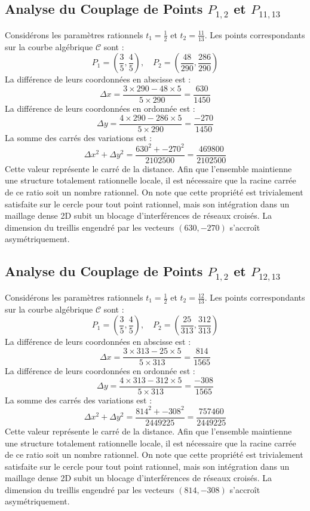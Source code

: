 \documentclass[12pt, a4paper]{article}
\begin{document}
\subsection{Analyse du Couplage de Points $P_{1,2}$ et $P_{11,13}$}
Considérons les paramètres rationnels $t_1 = \frac{1}{2}$ et $t_2 = \frac{11}{13}$.
Les points correspondants sur la courbe algébrique $\mathcal{C}$ sont :
$$ P_1 = \left( \frac{3}{5}, \frac{4}{5} \right), \quad P_2 = \left( \frac{48}{290}, \frac{286}{290} \right) $$
La différence de leurs coordonnées en abscisse est :
$$ \Delta x = \frac{3 \times 290 - 48 \times 5}{5 \times 290} = \frac{630}{1450} $$
La différence de leurs coordonnées en ordonnée est :
$$ \Delta y = \frac{4 \times 290 - 286 \times 5}{5 \times 290} = \frac{-270}{1450} $$
La somme des carrés des variations est :
$$ \Delta x^2 + \Delta y^2 = \frac{ 630^2 + -270^2 }{ 2102500 } = \frac{ 469800 }{ 2102500 } $$
Cette valeur représente le carré de la distance. Afin que l'ensemble maintienne une structure totalement rationnelle locale, il est nécessaire que la racine carrée de ce ratio soit un nombre rationnel. On note que cette propriété est trivialement satisfaite sur le cercle pour tout point rationnel, mais son intégration dans un maillage dense 2D subit un blocage d'interférences de réseaux croisés. La dimension du treillis engendré par les vecteurs $( 630, -270 )$ s'accroît asymétriquement.


\subsection{Analyse du Couplage de Points $P_{1,2}$ et $P_{12,13}$}
Considérons les paramètres rationnels $t_1 = \frac{1}{2}$ et $t_2 = \frac{12}{13}$.
Les points correspondants sur la courbe algébrique $\mathcal{C}$ sont :
$$ P_1 = \left( \frac{3}{5}, \frac{4}{5} \right), \quad P_2 = \left( \frac{25}{313}, \frac{312}{313} \right) $$
La différence de leurs coordonnées en abscisse est :
$$ \Delta x = \frac{3 \times 313 - 25 \times 5}{5 \times 313} = \frac{814}{1565} $$
La différence de leurs coordonnées en ordonnée est :
$$ \Delta y = \frac{4 \times 313 - 312 \times 5}{5 \times 313} = \frac{-308}{1565} $$
La somme des carrés des variations est :
$$ \Delta x^2 + \Delta y^2 = \frac{ 814^2 + -308^2 }{ 2449225 } = \frac{ 757460 }{ 2449225 } $$
Cette valeur représente le carré de la distance. Afin que l'ensemble maintienne une structure totalement rationnelle locale, il est nécessaire que la racine carrée de ce ratio soit un nombre rationnel. On note que cette propriété est trivialement satisfaite sur le cercle pour tout point rationnel, mais son intégration dans un maillage dense 2D subit un blocage d'interférences de réseaux croisés. La dimension du treillis engendré par les vecteurs $( 814, -308 )$ s'accroît asymétriquement.
\end{document}
